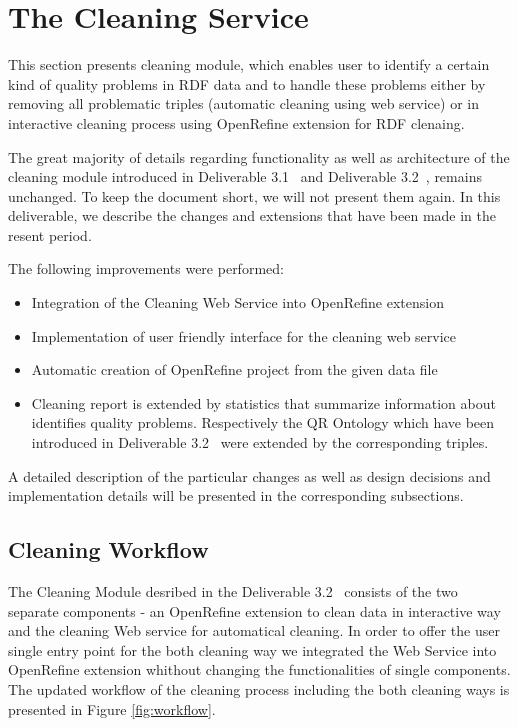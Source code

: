 \section{The Cleaning Service}
\label{sec:cleaning}

This section presents cleaning module, which enables user to identify a certain kind of quality problems in RDF data and to handle these problems either  by removing all problematic triples (automatic cleaning using web service) or in interactive cleaning process using OpenRefine extension for RDF clenaing. 

The great majority of details regarding functionality as well as architecture of the cleaning module introduced in Deliverable 3.1~\cite{d3.1} and Deliverable 3.2~\cite{d3.2}, remains unchanged.
To keep the document short, we will not present them again. 
In this deliverable, we describe the changes and extensions that have been made in the resent period. 

The following improvements were performed:
\begin{itemize}
\item Integration of the Cleaning Web Service into OpenRefine extension
\item Implementation of user friendly interface for the cleaning  web service
\item Automatic creation of OpenRefine project from the given data file
\item Cleaning report is extended by statistics that summarize information about identifies quality problems. Respectively the QR Ontology which have been introduced in Deliverable 3.2~\cite{d3.2} were extended by the corresponding triples. 
\end{itemize}
A detailed description of the particular changes as well as design decisions and implementation details will be presented in the corresponding subsections.


\subsection{Cleaning Workflow}
The Cleaning Module desribed in the Deliverable 3.2~\cite{d3.2} consists of the two separate components - an OpenRefine extension to clean data in interactive way and the cleaning Web service for automatical cleaning.
In order to offer the user single entry point for the both cleaning way  we integrated the Web Service into OpenRefine extension whithout changing the functionalities of single components.
The updated workflow of the cleaning process including the both cleaning ways is presented in Figure \ref{fig:workflow}.


